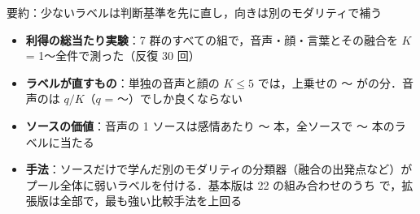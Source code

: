 
\begin{frame}{要約：少ないラベルは判断基準を先に直し，向きは別のモダリティで補う}
  \vspace{0.1em}
  \begin{itemize}\footnotesize\setlength{\itemsep}{8pt}
        \item \textbf{利得の総当たり実験}：7 群のすべての組で，音声・顔・言葉とその融合を $K$ = 1〜全件で測った（反復 30 回）
        \item \textbf{ラベルが直すもの}：単独の音声と顔の $K\le5$ では，上乗せの 〜 がの分．音声のは $q/K$（$q$ = 〜）でしか良くならない
        \item \textbf{ソースの価値}：音声の 1 ソースは感情あたり 〜 本，全ソースで 〜 本のラベルに当たる
        \item \textbf{手法}：ソースだけで学んだ別のモダリティの分類器（融合の出発点など）がプール全体に弱いラベルを付ける．基本版は 22 の組み合わせのうち  で，拡張版は全部で，最も強い比較手法を上回る
      \end{itemize}
\end{frame}

